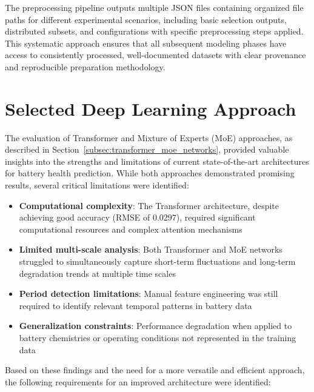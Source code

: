 The preprocessing pipeline outputs multiple JSON files containing organized file paths for different experimental scenarios, including basic selection outputs, distributed subsets, and configurations with specific preprocessing steps applied. This systematic approach ensures that all subsequent modeling phases have access to consistently processed, well-documented datasets with clear provenance and reproducible preparation methodology.

\section{Selected Deep Learning Approach}
\label{sec:timesnet_model}

The evaluation of Transformer and Mixture of Experts (MoE) approaches, as described in Section~\ref{subsec:transformer_moe_networks}, provided valuable insights into the strengths and limitations of current state-of-the-art architectures for battery health prediction. While both approaches demonstrated promising results, several critical limitations were identified:

\begin{itemize}
    \item \textbf{Computational complexity}: The Transformer architecture, despite achieving good accuracy (RMSE of 0.0297), required significant computational resources and complex attention mechanisms
    \item \textbf{Limited multi-scale analysis}: Both Transformer and MoE networks struggled to simultaneously capture short-term fluctuations and long-term degradation trends at multiple time scales
    \item \textbf{Period detection limitations}: Manual feature engineering was still required to identify relevant temporal patterns in battery data
    \item \textbf{Generalization constraints}: Performance degradation when applied to battery chemistries or operating conditions not represented in the training data
\end{itemize}

Based on these findings and the need for a more versatile and efficient approach, the following requirements for an improved architecture were identified:

